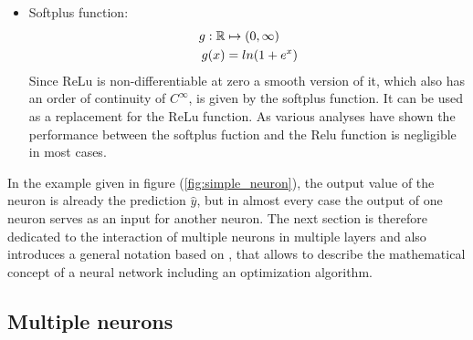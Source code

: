 \begin{itemize}
	\item Softplus function: 
		\begin{equation}
		\begin{split}
			g: \mathbb{R} 	& \mapsto (0,\infty) \\
			g(x) 	& = ln(1 + e^x) 
		\end{split}
		\end{equation}	
		 Since ReLu is non-differentiable at zero a smooth version of it, which also has an order of continuity of $C^{\infty}$, is given by the softplus function. It can be used as a replacement for the ReLu function. As various analyses have shown the performance between the softplus fuction and the Relu function is negligible in most cases. \cite{searchingActivation}
\end{itemize}

In the example given in figure (\ref{fig:simple_neuron}), the output value of the neuron is already the prediction $\hat{y}$, but in almost every case the output of one neuron serves as an input for another neuron. The next section is therefore dedicated to the interaction of multiple neurons in multiple layers and also introduces a general notation based on \cite{Mar_Pri}, that allows to describe the mathematical concept of a neural network including an optimization algorithm.


\subsection{Multiple neurons}

